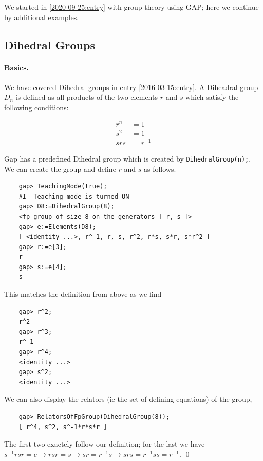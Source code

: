 
We started in \ref{2020-09-25:entry} with group theory using GAP; here we continue by additional examples.

\subsection{Dihedral Groups}

\paragraph{Basics.} We have covered Dihedral groups in entry \ref{2016-03-15:entry}. A Diheadral group $D_n$ is defined as all products of the two elements $r$ and $s$ which satisfy the following conditions:

\begin{align*}
r^n &= 1 \\
s^2 &= 1 \\
srs &= r^{-1}
\end{align*}

Gap has a predefined Dihedral group which is created by \verb+DihedralGroup(n);+. We can create the group and define $r$ and $s$ as follows.

\begin{verbatim}
    gap> TeachingMode(true);
    #I  Teaching mode is turned ON
    gap> D8:=DihedralGroup(8);
    <fp group of size 8 on the generators [ r, s ]>
    gap> e:=Elements(D8);
    [ <identity ...>, r^-1, r, s, r^2, r*s, s*r, s*r^2 ]
    gap> r:=e[3];
    r
    gap> s:=e[4];
    s
\end{verbatim}

This matches the definition from above as we find

\begin{verbatim}
    gap> r^2;
    r^2
    gap> r^3;
    r^-1
    gap> r^4;
    <identity ...>
    gap> s^2;
    <identity ...>
\end{verbatim}

We can also display the relators (ie the set of defining equations) of the group,

\begin{verbatim}
	gap> RelatorsOfFpGroup(DihedralGroup(8));
	[ r^4, s^2, s^-1*r*s*r ]
\end{verbatim}

The first two exactely follow our definition; for the last we have $s^{-1}rsr = e \rightarrow rsr = s \rightarrow sr = r^{-1}s \rightarrow srs = r^{-1}ss = r^{-1}$. \qed


